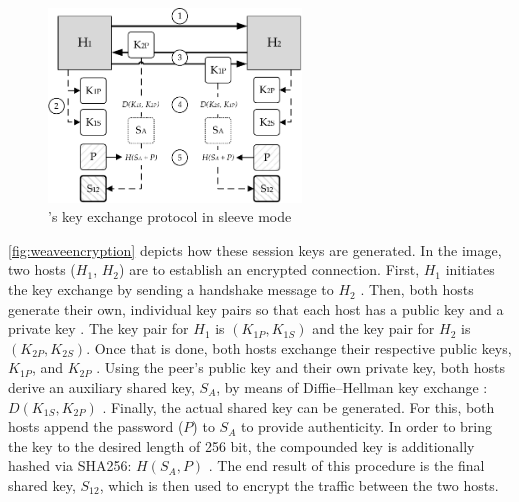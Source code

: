 \begin{figure}[htpb]
  \centering
  \includegraphics[width=0.6\textwidth]{figures/weave-encryption.pdf}
  \caption[\weave 's key exchange protocol]{\wnet 's key exchange protocol in sleeve mode}\label{fig:weaveencryption}
\end{figure} 
\autoref{fig:weaveencryption} depicts how these session keys are generated. In the image, two hosts ($H_1$, $H_2$) are to establish an encrypted connection. First, $H_1$ initiates the key exchange by sending a handshake message to $H_2$ . Then, both hosts generate their own, individual key pairs so that each host has a public key and a private key . The key pair for $H_1$ is $(K_{1P}, K_{1S})$ and the key pair for $H_2$ is $(K_{2P}, K_{2S})$. Once that is done, both hosts exchange their respective public keys, $K_{1P}$, and $K_{2P}$ . Using the peer's public key and their own private key, both hosts derive an auxiliary shared key, $S_A$, by means of Diffie--Hellman key exchange \cite{bresson2001provably}: $D(K_{1S},K_{2P})$ . Finally, the actual shared key can be generated. For this, both hosts append the password ($P$) to $S_A$ to provide authenticity. In order to bring the key to the desired length of 256 bit, the compounded key is additionally hashed via SHA256: $H(S_A, P)$ . The end result of this procedure is the final shared key, $S_{12}$, which is then used to encrypt the traffic between the two hosts.
%
%
%
%
%
%
%
%
%
%
%
%
%
%
%
%
%
%
%
%